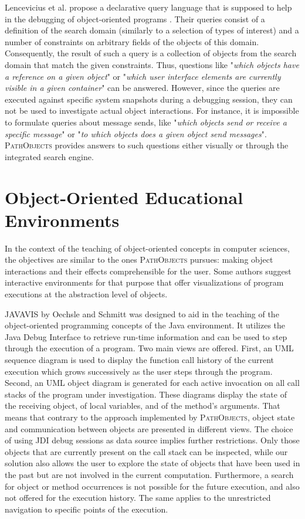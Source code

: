 Lencevicius et al. propose a declarative query language that is supposed to help in the debugging of object-oriented programs \cite{lencevicius_query-based_1997, guerraoui_dynamic_1999}.
Their queries consist of a definition of the search domain (similarly to a selection of types of interest) and a number of constraints on arbitrary fields of the objects of this domain.
Consequently, the result of such a query is a collection of objects from the search domain that match the given constraints.
Thus, questions like "\textit{which objects have a reference on a given object}" or "\textit{which user interface elements are currently visible in a given container}" can be answered.
However, since the queries are executed against specific system snapshots during a debugging session, they can not be used to investigate actual object interactions.
For instance, it is impossible to formulate queries about message sends, like "\textit{which objects send or receive a specific message}" or "\textit{to which objects does a given object send messages}".
\textsc{PathObjects} provides answers to such questions either visually or through the integrated search engine.

\section{Object-Oriented Educational Environments}
\label{s:RelatedEducational}
In the context of the teaching of object-oriented concepts in computer sciences, the objectives are similar to the ones \textsc{PathObjects} pursues: making object interactions and their effects comprehensible for the user.
Some authors suggest interactive environments for that purpose that offer visualizations of program executions at the abstraction level of objects.

\textsc{JAVAVIS} by Oechsle and Schmitt \cite{diehl_javavis:_2002} was designed to aid in the teaching of the object-oriented programming concepts of the Java environment.
It utilizes the Java Debug Interface to retrieve run-time information and can be used to step through the execution of a program.
Two main views are offered.
First, an UML sequence diagram is used to display the function call history of the current execution which grows successively as the user steps through the program.
Second, an UML object diagram is generated for each active invocation on all call stacks of the program under investigation.
These diagrams display the state of the receiving object, of local variables, and of the method's arguments.
That means that contrary to the approach implemented by \textsc{PathObjects}, object state and communication between objects are presented in different views.
The choice of using JDI debug sessions as data source implies further restrictions.
Only those objects that are currently present on the call stack can be inspected, while our solution also allows the user to explore the state of objects that have been used in the past but are not involved in the current computation.
Furthermore, a search for object or method occurrences is not possible for the future execution, and also not offered for the execution history.
The same applies to the unrestricted navigation to specific points of the execution.

